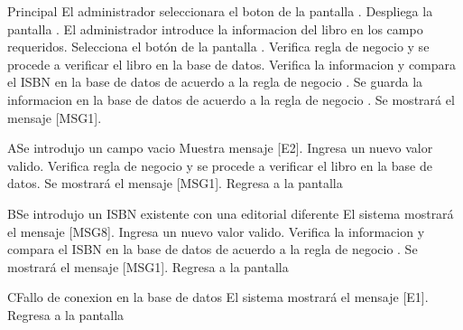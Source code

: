 \begin{UCtrayectoria}{Principal}
	\UCpaso[\UCactor] El administrador seleccionara el boton  de la pantalla .
	\UCpaso[\UCsist] Despliega la pantalla .
	\UCpaso[\UCactor] El administrador introduce la informacion del libro en los campo requeridos.
	\UCpaso[\UCactor] Selecciona el botón  de la pantalla .
	\UCpaso[\UCsist] Verifica regla de negocio  y se procede a verificar el libro en la base de datos.
	\UCpaso[\UCsist] Verifica la informacion y compara el ISBN en la base de datos de acuerdo a la regla de negocio  .
	\UCpaso[\UCsist] Se guarda la informacion en la base de datos de acuerdo a la regla de negocio  .
	\UCpaso[\UCsist] Se mostrará el mensaje [MSG1]. 
\end{UCtrayectoria}
\begin{UCtrayectoriaA}{A}{Se introdujo un campo vacio}	
			\UCpaso[\UCsist] Muestra mensaje [E2].
			\UCpaso[\UCactor] Ingresa un nuevo valor valido.
			\UCpaso[\UCsist] Verifica regla de negocio  y se procede a verificar el libro en la base de datos.
			\UCpaso[\UCsist] Se mostrará el mensaje [MSG1].
			\UCpaso[\UCsist] Regresa a la pantalla 			
\end{UCtrayectoriaA}
\begin{UCtrayectoriaA}{B}{Se introdujo un ISBN existente con una editorial diferente}	
			\UCpaso[\UCsist] El sistema mostrará el mensaje [MSG8].
			\UCpaso[\UCactor] Ingresa un nuevo valor valido.
			\UCpaso[\UCsist] Verifica la informacion y compara el ISBN en la base de datos de acuerdo a la regla de negocio  .
			\UCpaso[\UCsist] Se mostrará el mensaje [MSG1].
			\UCpaso[\UCsist] Regresa a la pantalla 	
\end{UCtrayectoriaA}
\begin{UCtrayectoriaA}{C}{Fallo de conexion en la base de datos}
			\UCpaso[\UCsist] El sistema mostrará el mensaje [E1].
			\UCpaso[\UCsist] Regresa a la pantalla 	
\end{UCtrayectoriaA}